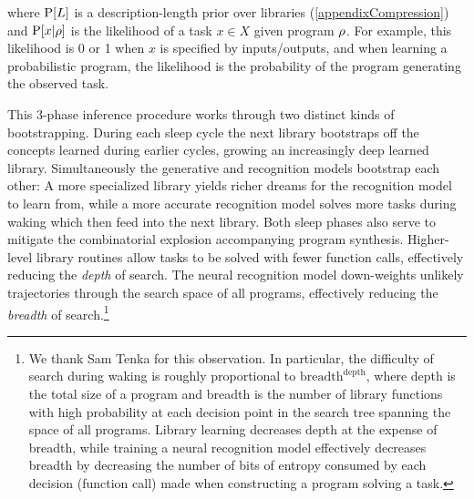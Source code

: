 \documentclass[12pt]{article}
\begin{document}
where $\text{P}[L]$ is a description-length prior over libraries (\ref{appendixCompression}) and  $\text{P}[x|\rho]$ is the likelihood of a task $x\in X$ given program $\rho$.
For example, this likelihood is 0 or 1 when $x$ is specified by inputs/outputs,
and when learning a probabilistic program, the likelihood is the probability of the program generating the observed task.





This 3-phase inference procedure works through two distinct kinds of
bootstrapping.  During each sleep cycle the next library bootstraps
off the concepts learned during earlier cycles, growing an
increasingly deep learned library.  Simultaneously the
generative and recognition models bootstrap each other: A more specialized
library yields richer dreams for the recognition
model to learn from, while a more accurate recognition model solves
more tasks during waking which then feed into the next library.
Both sleep phases also serve to mitigate the combinatorial explosion
accompanying program synthesis.
Higher-level library routines allow tasks to be solved with fewer function calls,
effectively reducing the \emph{depth} of search.
The neural recognition model down-weights unlikely trajectories through the search space of all programs,
effectively reducing the \emph{breadth} of search.\footnote{We thank Sam Tenka for this observation. In particular, the difficulty of search during waking is roughly proportional to $\text{breadth}^\text{depth}$, where depth is the total size of a program and breadth is the number of library functions with high probability at each decision point in the search tree spanning the space of all programs. Library learning decreases depth at the expense of breadth, while training a neural recognition model effectively decreases breadth by decreasing the number of bits of entropy consumed by each decision (function call) made when constructing a program solving a task.}
\end{document}
